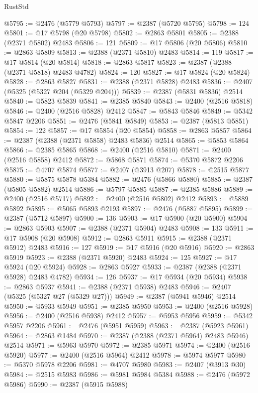 \begin{lexlean}{RustStd}
\begin{coremodule}
@5795 := @2476 (@5779 @5793)
@5797 := @2387 (@5720 @5795)
@5798 := 124
@5801 := @17 @5798 (@20 @5798)
@5802 := @2863 @5801
@5805 := @2388 (@2371 @5802) @2483
@5806 := 121
@5809 := @17 @5806 (@20 @5806)
@5810 := @2863 @5809
@5813 := @2388 (@2371 @5810) @2483
@5814 := 119
@5817 := @17 @5814 (@20 @5814)
@5818 := @2863 @5817
@5823 := @2387 (@2388 (@2371 @5818) @2483 @4782)
@5824 := 120
@5827 := @17 @5824 (@20 @5824)
@5828 := @2863 @5827
@5831 := @2388 (@2371 @5828) @2483
@5836 := @2407 (@5325 (@5327 @204 (@5329 @204)))
@5839 := @2387 (@5831 @5836) @2514
@5840 := @5823 @5839
@5841 := @2385 @5840
@5843 := @2400 (@2516 @5818)
@5846 := @2400 (@2516 @5828) @2412
@5847 := @5843 @5846
@5849 := @5342 @5847 @2206
@5851 := @2476 (@5841 @5849)
@5853 := @2387 (@5813 @5851)
@5854 := 122
@5857 := @17 @5854 (@20 @5854)
@5858 := @2863 @5857
@5864 := @2387 (@2388 (@2371 @5858) @2483 @5836) @2514
@5865 := @5853 @5864
@5866 := @2385 @5865
@5868 := @2400 (@2516 @5810)
@5871 := @2400 (@2516 @5858) @2412
@5872 := @5868 @5871
@5874 := @5370 @5872 @2206
@5875 := @4707 @5874
@5877 := @2407 (@3913 @207)
@5878 := @2515 @5877
@5880 := @5875 @5878 @5384
@5882 := @2476 (@5866 @5880)
@5885 := @2387 (@5805 @5882) @2514
@5886 := @5797 @5885
@5887 := @2385 @5886
@5889 := @2400 (@2516 @5717)
@5892 := @2400 (@2516 @5802) @2412
@5893 := @5889 @5892
@5895 := @5065 @5893 @2193
@5897 := @2476 (@5887 @5895)
@5899 := @2387 (@5712 @5897)
@5900 := 136
@5903 := @17 @5900 (@20 @5900)
@5904 := @2863 @5903
@5907 := @2388 (@2371 @5904) @2483
@5908 := 133
@5911 := @17 @5908 (@20 @5908)
@5912 := @2863 @5911
@5915 := @2388 (@2371 @5912) @2483
@5916 := 127
@5919 := @17 @5916 (@20 @5916)
@5920 := @2863 @5919
@5923 := @2388 (@2371 @5920) @2483
@5924 := 125
@5927 := @17 @5924 (@20 @5924)
@5928 := @2863 @5927
@5933 := @2387 (@2388 (@2371 @5928) @2483 @4782)
@5934 := 126
@5937 := @17 @5934 (@20 @5934)
@5938 := @2863 @5937
@5941 := @2388 (@2371 @5938) @2483
@5946 := @2407 (@5325 (@5327 @27 (@5329 @27)))
@5949 := @2387 (@5941 @5946) @2514
@5950 := @5933 @5949
@5951 := @2385 @5950
@5953 := @2400 (@2516 @5928)
@5956 := @2400 (@2516 @5938) @2412
@5957 := @5953 @5956
@5959 := @5342 @5957 @2206
@5961 := @2476 (@5951 @5959)
@5963 := @2387 (@5923 @5961)
@5964 := @2863 @1484
@5970 := @2387 (@2388 (@2371 @5964) @2483 @5946) @2514
@5971 := @5963 @5970
@5972 := @2385 @5971
@5974 := @2400 (@2516 @5920)
@5977 := @2400 (@2516 @5964) @2412
@5978 := @5974 @5977
@5980 := @5370 @5978 @2206
@5981 := @4707 @5980
@5983 := @2407 (@3913 @30)
@5984 := @2515 @5983
@5986 := @5981 @5984 @5384
@5988 := @2476 (@5972 @5986)
@5990 := @2387 (@5915 @5988)

\end{coremodule}
\end{lexlean}
